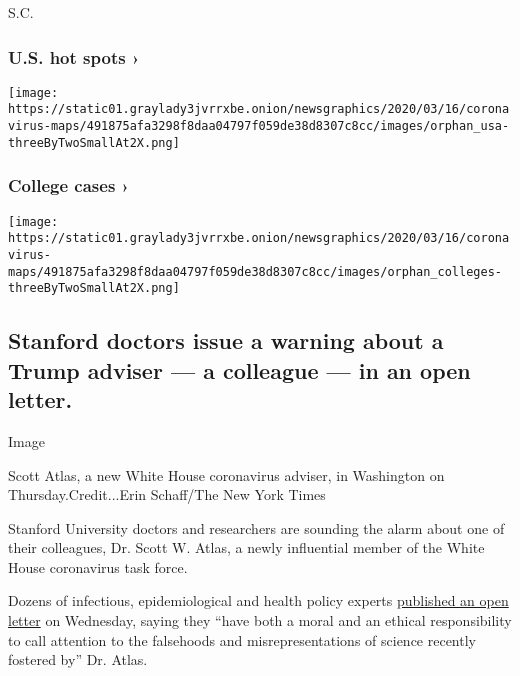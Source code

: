 S.C.

\href{https://www.nytimes3xbfgragh.onion/interactive/2020/us/coronavirus-us-cases.html}{}

\hypertarget{us-hot-spots-}{%
\subsubsection{U.S. hot spots ›}\label{us-hot-spots-}}

\texttt{[image: https://static01.graylady3jvrrxbe.onion/newsgraphics/2020/03/16/coronavirus-maps/491875afa3298f8daa04797f059de38d8307c8cc/images/orphan\_usa-threeByTwoSmallAt2X.png]}
\href{https://www.nytimes3xbfgragh.onion/interactive/2020/us/covid-college-cases-tracker.html}{}

\hypertarget{college-cases-}{%
\subsubsection{College cases ›}\label{college-cases-}}

\texttt{[image: https://static01.graylady3jvrrxbe.onion/newsgraphics/2020/03/16/coronavirus-maps/491875afa3298f8daa04797f059de38d8307c8cc/images/orphan\_colleges-threeByTwoSmallAt2X.png]}

\hypertarget{stanford-doctors-issue-a-warning-about-a-trump-adviser--a-colleague--in-an-open-letter}{%
\subsection{Stanford doctors issue a warning about a Trump adviser --- a
colleague --- in an open
letter.}\label{stanford-doctors-issue-a-warning-about-a-trump-adviser--a-colleague--in-an-open-letter}}

Image

Scott Atlas, a new White House coronavirus adviser, in Washington on
Thursday.Credit...Erin Schaff/The New York Times

Stanford University doctors and researchers are sounding the alarm about
one of their colleagues, Dr. Scott W. Atlas, a newly influential member
of the White House coronavirus task force.

Dozens of infectious, epidemiological and health policy experts
\href{https://int.graylady3jvrrxbe.onion/data/documenttools/read-the-open-letter-from-stanford-doctors-on-scott-atlas/813b50f72b6543b4/full.pdf}{published
an open letter} on Wednesday, saying they ``have both a moral and an
ethical responsibility to call attention to the falsehoods and
misrepresentations of science recently fostered by'' Dr. Atlas.

